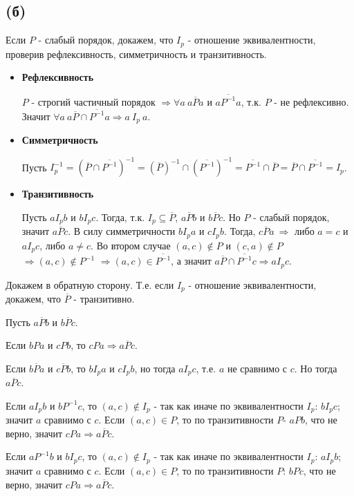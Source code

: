 \documentclass{article}
\begin{document}
	\subsection {(б)}
	Если $P$ - слабый порядок, докажем, что $I_p$ - отношение эквивалентности, проверив рефлексивность, симметричность и транзитивность.
	
	\begin{itemize}
	\item \textbf{Рефлексивность}
	
	$P$ - строгий частичный порядок $\Rightarrow\forall a\  a\overline{P}a $ и $a\overline{P^{-1}}a$, т.к. $P$ - не рефлексивно. Значит $\forall a\ a \overline{P} \cap \overline{P^{-1}} a \Rightarrow a\ I_p\ a$.  
		
	\item \textbf{Симметричность}
	
	Пусть $I_p^{-1} = (\overline{P} \cap \overline{P^{-1}})^{-1} = (\overline{P}) ^ {-1} \cap (\overline{P^{-1}})^{-1} = \overline{P^{-1}} \cap \overline{P} = \overline{P} \cap \overline{P^{-1}} = I_p$.
	
	\item \textbf{Транзитивность}
	
	Пусть $aI_pb$ и $bI_pc$. Тогда, т.к. $I_p \subseteq \overline{P}$, $a \overline{P} b$ и $b \overline{P} c$. Но $P$ - слабый порядок, значит $a \overline{P} c$. В силу симметричности $bI_pa$ и $cI_pb$. Тогда, $c \overline{P} a\ \Rightarrow$ либо $a = c$ и $aI_pc$, либо $a \ne c$. Во втором случае $(a, c) \notin P$ и $(c, a) \notin P$ $\Rightarrow (a, c) \notin P^{-1}$ $\Rightarrow (a, c) \in \overline{P^{-1}}$, а значит $a \overline{P} \cap \overline{P^{-1}} c \Rightarrow aI_pc$.
\end{itemize}
	Докажем в обратную сторону. Т.е. если $I_p$ - отношение эквивалентности, докажем, что $\overline{P}$ - транзитивно.
	
	Пусть $a\overline{P}b$ и $b\overline{P}c$.
	
	Если $bPa$ и $cPb$, то $cPa \Rightarrow a\overline{P}c$. 
	
	Если $b\overline{P}a$ и $c\overline{P}b$, то $bI_pa$ и $cI_pb$, но тогда $aI_pc$, т.е. $a$ не сравнимо с $c$. Но тогда $a\overline{P}c$.
	
	Если $aI_pb$ и $bP^{-1}c$, то $(a, c) \notin I_p$ - так как иначе по эквивалентности $I_p$: $bI_pc$; значит $a$ сравнимо с $c$. Если $(a, c) \in P$, то по транзитивности $P$-  $aPb$, что не верно, значит $cPa \Rightarrow a\overline{P}c$.  

	Если $aP^{-1}b$ и $bI_pc$, то $(a, c) \notin I_p$ - так как иначе по эквивалентности $I_p$: $aI_pb$; значит $a$ сравнимо с $c$. Если $(a, c) \in P$, то по транзитивности $P$: $bPc$, что не верно, значит $cPa \Rightarrow a\overline{P}c$.
\end{document}
